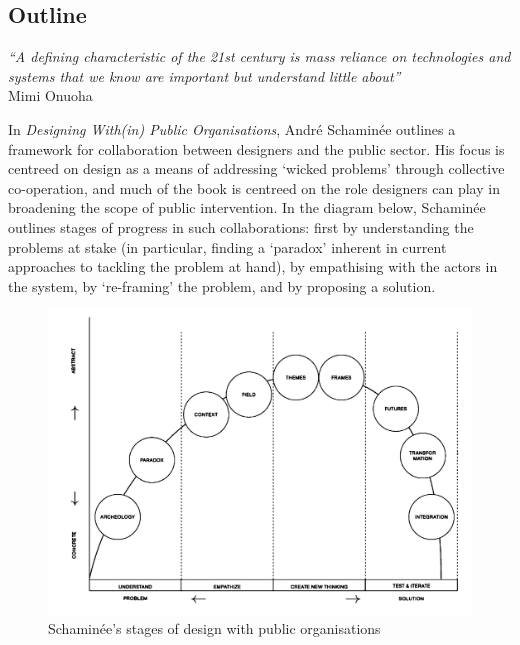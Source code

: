 \documentclass[nofonts,nols,justified,nobib]{tufte-book}
\begin{document}
\subsection*{Outline}

\begin{flushright}
\emph{``A defining characteristic of the 21st century is mass reliance on technologies and systems that we know are important but understand little about''} \cite{onuoha_i_2016}\\
Mimi Onuoha
\end{flushright}

In \emph{Designing With(in) Public Organisations}, Andr\'e Schamin\'ee outlines a framework for collaboration between designers and the public sector. His focus is centreed on design as a means of addressing `wicked problems'\cite{rittel_dilemmas_1973} through collective co-operation, and much of the book is centreed on the role designers can play in broadening the scope of public intervention. In the diagram below, Schamin\'ee outlines stages of progress in such collaborations: first by understanding the problems at stake (in particular, finding a `paradox' inherent in current approaches to tackling the problem at hand), by empathising with the actors in the system, by `re-framing' the problem, and by proposing a solution. \cite{schaminee_designing_2018}

\begin{figure}
\includegraphics[width=\textwidth]{img/1/design-stages}
\caption{Schamin\'ee's stages of design with public organisations \cite{schaminee_designing_2018}}
\end{figure}
\end{document}
